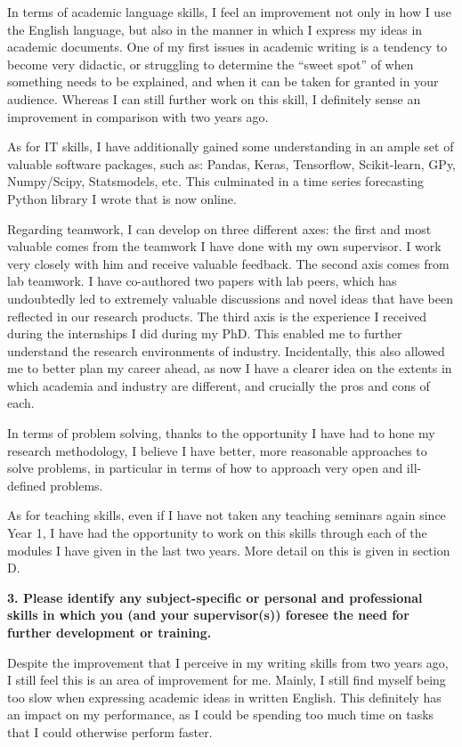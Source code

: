 \documentclass[pdftex,12pt,a4paper]{article}
\theoremstyle{definition}
\theoremstyle{remark}
\begin{document}
In terms of academic language skills, I feel an improvement not only in how I use the English language, but also in the manner in which I express my ideas in academic documents. One of my first issues in academic writing is a tendency to become very didactic, or struggling to determine the “sweet spot” of when something needs to be explained, and when it can be taken for granted in your audience. Whereas I can still further work on this skill, I definitely sense an improvement in comparison with two years ago.

As for IT skills, I have additionally gained some understanding in an ample set of valuable software packages, such as: Pandas, Keras, Tensorflow, Scikit-learn, GPy, Numpy/Scipy, Statsmodels, etc. This culminated in a time series forecasting Python library I wrote that is now online. 

Regarding teamwork, I can develop on three different axes: the first and most valuable comes from the teamwork I have done with my own supervisor. I work very closely with him and receive valuable feedback. The second axis comes from lab teamwork. I have co-authored two papers with lab peers, which has undoubtedly led to extremely valuable discussions and novel ideas that have been reflected in our research products. The third axis is the experience I received during the internships I did during my PhD. This enabled me to further understand the research environments of industry. Incidentally, this also allowed me to better plan my career ahead, as now I have a clearer idea on the extents in which academia and industry are different, and crucially the pros and cons of each.

In terms of problem solving, thanks to the opportunity I have had to hone my research methodology, I believe I have better, more reasonable approaches to solve problems, in particular in terms of how to approach very open and ill-defined problems.

As for teaching skills, even if I have not taken any teaching seminars again since Year 1, I have had the opportunity to work on this skills through each of the modules I have given in the last two years. More detail on this is given in section D.

\textbf{3. Please identify any subject-specific or personal and professional skills in which you (and your supervisor(s)) foresee the need for further development or training.}

Despite the improvement that I perceive in my writing skills from two years ago, I still feel this is an area of improvement for me. Mainly, I still find myself being too slow when expressing academic ideas in written English. This definitely has an impact on my performance, as I could be spending too much time on tasks that I could otherwise perform faster.
\end{document}
